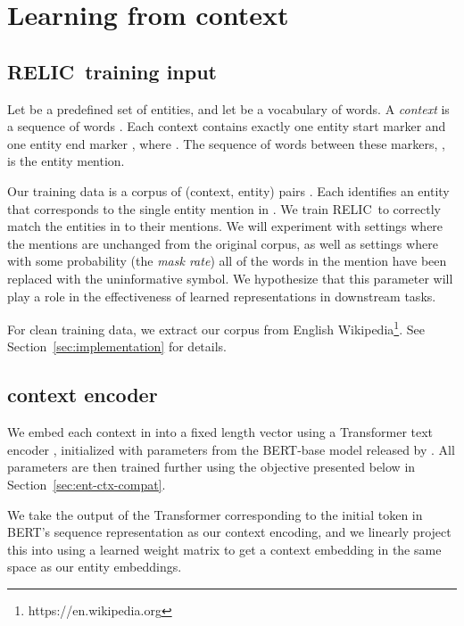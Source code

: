 \documentclass{article} \usepackage{iclr2020_conference,times}
\newcommand{\ack}{RELIC\xspace}
\begin{document}
%
 
\section{Learning from context}\label{sec:learning_setup}

\newcommand{\entstart}{[\textsc{e}_s]}
\newcommand{\entend}{[\textsc{e}_e]}

\subsection{\ack~training input}
Let  be a predefined set of entities, and let  be a vocabulary of words.
A \emph{context}  is a sequence of words . 
Each context contains exactly one entity start marker  and one entity end marker , where . 
The sequence of words between these markers, , is the entity mention. 

Our training data is a corpus of (context, entity) pairs .
Each  identifies an entity that corresponds to the single entity mention in . 
We train \ack~to correctly match the entities in  to their mentions.
We will experiment with settings where the mentions are unchanged from the original corpus, as well as settings where with some probability  (the \textit{mask rate}) all of the words in the mention have been replaced with the uninformative  symbol. We hypothesize that this parameter will play a role in the effectiveness of learned representations in downstream tasks.

For clean training data, we extract our corpus from English Wikipedia\footnote{https://en.wikipedia.org}. See Section~\ref{sec:implementation} for details.

\subsection{context encoder}
We embed each context in  into a fixed length vector using a Transformer text encoder \citep{vaswani2017attention}, initialized with parameters from the BERT-base model released by \citealt{devlin2018bert}.
All parameters are then trained further using the objective presented below in Section~\ref{sec:ent-ctx-compat}.

We take the output of the Transformer corresponding to the initial  token in BERT's sequence representation as our context encoding, and we linearly project this into  using a learned weight matrix  to get a context embedding in the same space as our entity embeddings.
\end{document}
